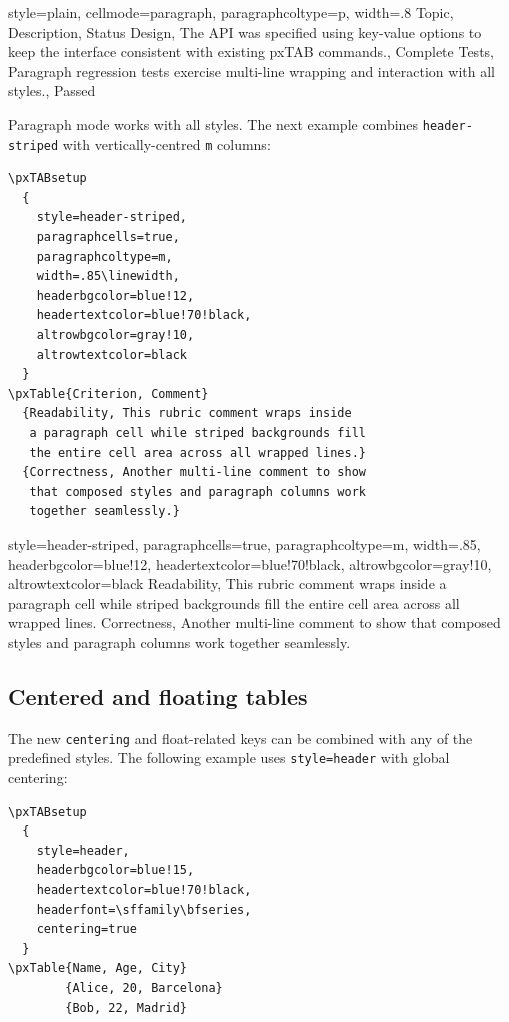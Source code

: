 \documentclass[11pt,a4paper]{article}
\begin{document}
\pxTABsetup
  {
    style=plain,
    cellmode=paragraph,
    paragraphcoltype=p,
    width=.8\linewidth
  }
\pxTable
  {Topic, Description, Status}
  {Design, The API was specified using key-value options
   to keep the interface consistent with existing pxTAB
   commands., Complete}
  {Tests, Paragraph regression tests exercise multi-line
   wrapping and interaction with all styles., Passed}

Paragraph mode works with all styles.  The next example combines
\texttt{header-striped} with vertically-centred \texttt{m} columns:

\begin{verbatim}
\pxTABsetup
  {
    style=header-striped,
    paragraphcells=true,
    paragraphcoltype=m,
    width=.85\linewidth,
    headerbgcolor=blue!12,
    headertextcolor=blue!70!black,
    altrowbgcolor=gray!10,
    altrowtextcolor=black
  }
\pxTable{Criterion, Comment}
  {Readability, This rubric comment wraps inside
   a paragraph cell while striped backgrounds fill
   the entire cell area across all wrapped lines.}
  {Correctness, Another multi-line comment to show
   that composed styles and paragraph columns work
   together seamlessly.}
\end{verbatim}

\pxTABsetup
  {
    style=header-striped,
    paragraphcells=true,
    paragraphcoltype=m,
    width=.85\linewidth,
    headerbgcolor=blue!12,
    headertextcolor=blue!70!black,
    altrowbgcolor=gray!10,
    altrowtextcolor=black
  }
  {Readability, This rubric comment wraps inside
   a paragraph cell while striped backgrounds fill
   the entire cell area across all wrapped lines.}
  {Correctness, Another multi-line comment to show
   that composed styles and paragraph columns work
   together seamlessly.}

\subsection{Centered and floating tables}

The new \texttt{centering} and float-related keys can be combined with
any of the predefined styles.  The following example uses
\texttt{style=header} with global centering:

\begin{verbatim}
\pxTABsetup
  {
    style=header,
    headerbgcolor=blue!15,
    headertextcolor=blue!70!black,
    headerfont=\sffamily\bfseries,
    centering=true
  }
\pxTable{Name, Age, City}
        {Alice, 20, Barcelona}
        {Bob, 22, Madrid}
\end{verbatim}
\end{document}
